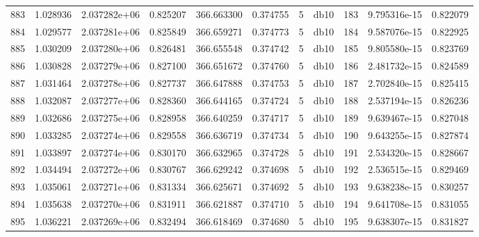 \begin{tabular}{lrrrrrrlrrr}
883  &    1.028936 &        2.037282e+06 &  0.825207 &              366.663300 &    0.374755 &       5 &         db10 &    183 &   9.795316e-15 &      0.822079 \\
884  &    1.029577 &        2.037281e+06 &  0.825849 &              366.659271 &    0.374773 &       5 &         db10 &    184 &   9.587076e-15 &      0.822925 \\
885  &    1.030209 &        2.037280e+06 &  0.826481 &              366.655548 &    0.374742 &       5 &         db10 &    185 &   9.805580e-15 &      0.823769 \\
886  &    1.030828 &        2.037279e+06 &  0.827100 &              366.651672 &    0.374760 &       5 &         db10 &    186 &   2.481732e-15 &      0.824589 \\
887  &    1.031464 &        2.037278e+06 &  0.827737 &              366.647888 &    0.374753 &       5 &         db10 &    187 &   2.702840e-15 &      0.825415 \\
888  &    1.032087 &        2.037277e+06 &  0.828360 &              366.644165 &    0.374724 &       5 &         db10 &    188 &   2.537194e-15 &      0.826236 \\
889  &    1.032686 &        2.037275e+06 &  0.828958 &              366.640259 &    0.374717 &       5 &         db10 &    189 &   9.639467e-15 &      0.827048 \\
890  &    1.033285 &        2.037274e+06 &  0.829558 &              366.636719 &    0.374734 &       5 &         db10 &    190 &   9.643255e-15 &      0.827874 \\
891  &    1.033897 &        2.037274e+06 &  0.830170 &              366.632965 &    0.374728 &       5 &         db10 &    191 &   2.534320e-15 &      0.828667 \\
892  &    1.034494 &        2.037272e+06 &  0.830767 &              366.629242 &    0.374698 &       5 &         db10 &    192 &   2.536515e-15 &      0.829469 \\
893  &    1.035061 &        2.037271e+06 &  0.831334 &              366.625671 &    0.374692 &       5 &         db10 &    193 &   9.638238e-15 &      0.830257 \\
894  &    1.035638 &        2.037270e+06 &  0.831911 &              366.621887 &    0.374710 &       5 &         db10 &    194 &   9.641708e-15 &      0.831055 \\
895  &    1.036221 &        2.037269e+06 &  0.832494 &              366.618469 &    0.374680 &       5 &         db10 &    195 &   9.638307e-15 &      0.831827 \\

\end{tabular}
